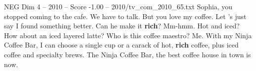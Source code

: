\begin{textsample}{NEG Dim 4 – 2010 – Score -1.00 – 2010/tv\_com\_2010\_65.txt}  \label{ex:f4_neg_048}
Sophia, you stopped coming to the cafe.
We have to talk.
But you love my coffee.
Let 's just say I found something better.
Can he make it \textbf{rich}?
Mm-hmm.
Hot and iced?
How about an iced layered latte?
Who is this coffee maestro?
Me.
With my Ninja Coffee Bar, I can choose a single cup or a carack of hot, \textbf{rich} coffee, plus iced coffee and specialty brews.
The Ninja Coffee Bar, the best coffee house in town is now.

\end{textsample}
